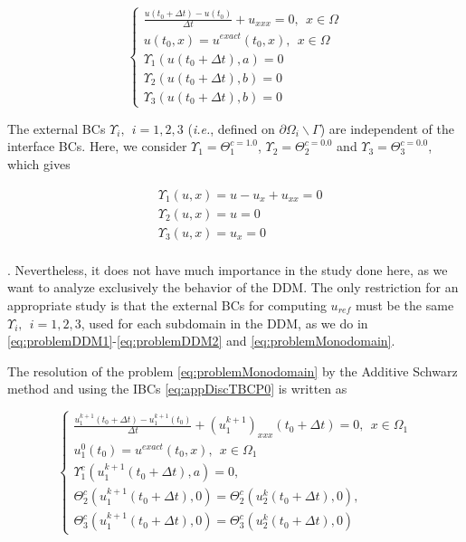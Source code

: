 \begin{equation}
	\label{eq:problemMonodomain}
	\begin{cases}
	\frac{u(t_0+\Delta t) - u(t_0)}{\Delta t} + u_{xxx} = 0, \ \ x \in \Omega\\
	u(t_0,x) = u^{exact}(t_0,x) , \ \ x \in \Omega \\ 
	\Upsilon_1(u(t_0 + \Delta t),a) = 0\\
	\Upsilon_2(u(t_0 + \Delta t),b) = 0\\
	\Upsilon_3(u(t_0 + \Delta t),b) = 0
	\end{cases}
\end{equation}

\indent The external BCs $ \Upsilon_i, \ \ i=1,2,3$ (\emph{i.e.}, defined on $\partial \Omega_i \backslash \Gamma$) are independent of the interface BCs. Here, we consider $\Upsilon_1 = \Theta_1^{c = 1.0}$, $\Upsilon_2 = \Theta_2^{c = 0.0}$ and $\Upsilon_3 = \Theta_3^{c = 0.0}$, which gives

\begin{align*}
	&\Upsilon_1(u,x) = u - u_x + u_{xx} = 0\\
	&\Upsilon_2(u,x) = u = 0\\
	&\Upsilon_3(u,x) = u_x = 0\\
\end{align*}

\indent {} . Nevertheless, it does not have much importance in the study done here, as we want to analyze exclusively the behavior of the DDM. The only restriction for an appropriate study is that the external BCs for computing $u_{ref}$ must be the same $\Upsilon_i, \ \ i=1,2,3$, used for each subdomain in the DDM, as we do in \eqref{eq:problemDDM1}-\eqref{eq:problemDDM2} and \eqref{eq:problemMonodomain}.

\indent The resolution of the problem \eqref{eq:problemMonodomain} by the Additive Schwarz method and using the IBCs \eqref{eq:appDiscTBCP0} is written as

\begin{equation}
    \label{eq:problemDDM1}
    \begin{cases}
        \frac{u_1^{k+1}(t_0+\Delta t) - u_1^{k+1}(t_0)}{\Delta t} + (u_1^{k+1})_{xxx}(t_0+\Delta t) = 0 , \ \ x \in \Omega_1\\
        u_1^{0}(t_0) = u^{exact}(t_0,x) , \ \ x \in \Omega_1 \\
        \Upsilon_1^{c}(u_1^{k+1}(t_0+\Delta t),a) = 0, \\ 
        \Theta_2^{c}(u_1^{k+1}(t_0+\Delta t),0) = \Theta_2^{c}(u_2^{k}(t_0+\Delta t),0) , \\
        \Theta_3^{c}(u_1^{k+1}(t_0+\Delta t),0) = \Theta_3^{c}(u_2^{k}(t_0+\Delta t),0)
     \end{cases}
\end{equation}

